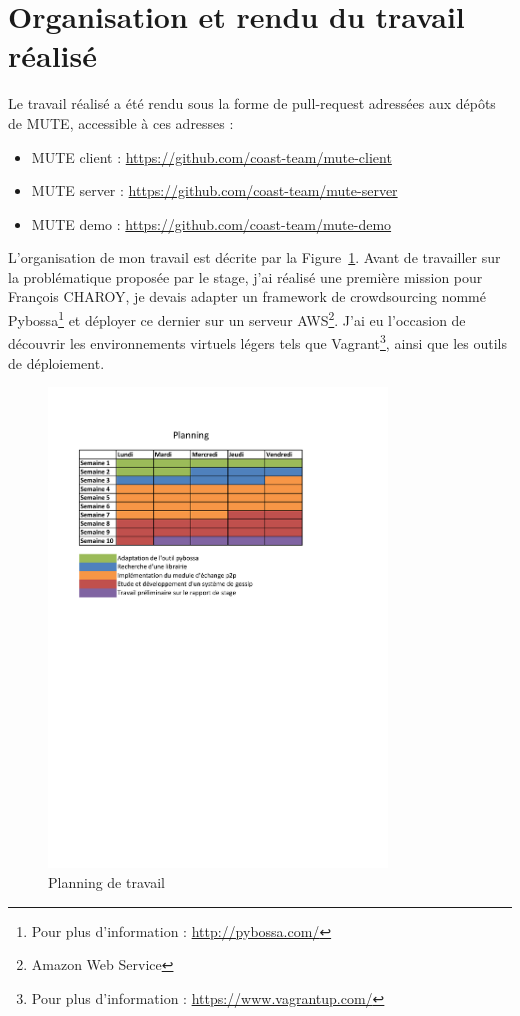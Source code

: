 \documentclass{tnreport}
\begin{document}
\section{Organisation et rendu du travail réalisé}
\label{sec:orga}

Le travail réalisé a été rendu sous la forme de pull-request adressées aux dépôts de MUTE, accessible à ces adresses :
\begin{itemize}
  \item MUTE client : \url{https://github.com/coast-team/mute-client}
  \item MUTE server : \url{https://github.com/coast-team/mute-server}
  \item MUTE demo : \url{https://github.com/coast-team/mute-demo}\\
\end{itemize}

L'organisation de mon travail est décrite par la Figure~\ref{fig:planning}. Avant de travailler sur la problématique proposée par le stage, j'ai réalisé une première mission pour François CHAROY, je devais adapter un framework de crowdsourcing nommé Pybossa\footnote{Pour plus d'information : \url{http://pybossa.com/}} et déployer ce dernier sur un serveur AWS\footnote{Amazon Web Service}. J'ai eu l'occasion de découvrir les environnements virtuels légers tels que Vagrant\footnote{Pour plus d'information : \url{https://www.vagrantup.com/}}, ainsi que les outils de déploiement.

\begin{figure}[!h]
  \centering
  \includegraphics[width=9cm]{figures/planning}
  \caption{Planning de travail}
  \label{fig:planning}
\end{figure}
\end{document}
